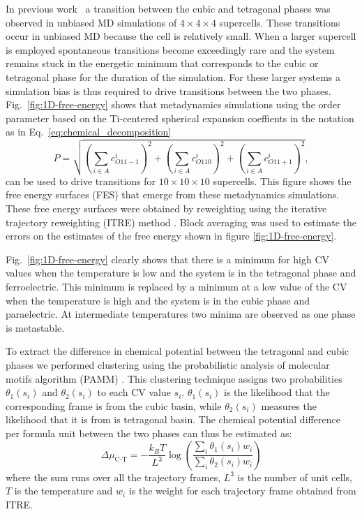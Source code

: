 In previous work~\cite{gigli_thermodynamics_2022} a transition between the cubic and tetragonal phases was observed in unbiased MD simulations of $4\times4\times4$ supercells.  These transitions occur in unbiased MD because the cell is relatively small.  When a larger supercell is employed spontaneous transitions become exceedingly rare and the system remains stuck in the energetic minimum that corresponds to the cubic or tetragonal phase for the duration of the simulation.  For these larger systems a simulation bias is thus required to drive transitions between the two phases.  Fig.~\ref{fig:1D-free-energy} shows that metadynamics simulations using the order parameter based on the Ti-centered spherical expansion coeffients in the notation as in Eq.~\eqref{eq:chemical_decomposition}
\begin{equation}
  P = \sqrt{(\sum_{i\in A} c_{O11-1}^i)^2 + (\sum_{i\in A} c_{O110}^i)^2 + (\sum_{i\in A} c_{O11+1}^i)^2}, 
\end{equation}
can be used to drive  transitions for $10\times10\times10$ supercells. This figure shows the free energy surfaces (FES) that emerge from these metadynamics simulations. These free energy surfaces were obtained by reweighting using the iterative trajectory reweighting (ITRE) method \cite{giberti_iterative_2020}.  Block averaging was used to estimate the errors on the estimates of the free energy shown in figure \ref{fig:1D-free-energy}. 

Fig.~\ref{fig:1D-free-energy} clearly shows that there is a minimum for high CV values when the temperature is low and the system is in the tetragonal phase and ferroelectric. This minimum is replaced by a minimum at a low value of the CV when the temperature is high and the system is in the cubic phase and paraelectric.  At intermediate temperatures two minima are observed as one phase is metastable.

To extract the difference in chemical potential between the tetragonal and cubic phases we performed clustering using the probabilistic analysis of molecular motifs algorithm (PAMM) \cite{gasp+18jctc}. This clustering technique assigns two probabilities $\theta_1(s_i)$ and $\theta_2(s_i)$ to each CV value $s_i$.  $\theta_1(s_i)$ is the likelihood that the corresponding frame is from the cubic basin, while  $\theta_2(s_i)$ measures the likelihood that it is from is tetragonal basin. The chemical potential difference per formula unit between the two phases can thus be estimated as:
$$
\Delta\mu_{\textrm{C-T}} = -\frac{k_B T}{L^3} \log \left( \frac{\sum_i \theta_1(s_i) w_i}{\sum_i \theta_2(s_i) w_i} \right) 
$$
where the sum runs over all the trajectory frames, $L^3$ is the number of unit cells, $T$ is the temperature and $w_i$ is the weight for each trajectory frame obtained from ITRE.  

